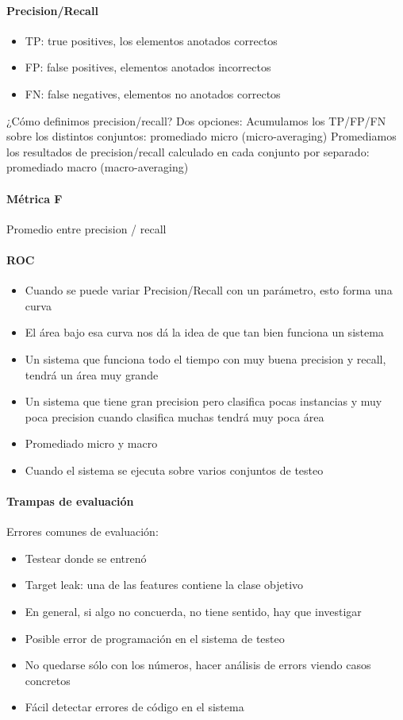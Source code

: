 \documentclass[a4paper,12pt,spanish]{book}
\begin{document}
	\paragraph {Precision/Recall}
	  \begin{itemize}	
	    \item TP: true positives, los elementos anotados correctos
	    \item FP: false positives, elementos anotados incorrectos
	    \item FN: false negatives, elementos no anotados correctos
	  \end{itemize}
	  ¿Cómo definimos precision/recall?
	  Dos opciones:
	  Acumulamos los TP/FP/FN sobre los distintos conjuntos: promediado micro (micro-averaging)
	  Promediamos los resultados de precision/recall calculado en cada conjunto por separado: promediado macro (macro-averaging)

	\paragraph {Métrica F }
	  Promedio entre precision / recall

	\paragraph {ROC}
	  \begin{itemize}
	    \item Cuando se puede variar Precision/Recall con un parámetro, esto forma una curva
	    \item El área bajo esa curva nos dá la idea de que tan bien funciona un sistema
	    \item Un sistema que funciona todo el tiempo con muy buena precision y recall, tendrá un área muy grande
	    \item Un sistema que tiene gran precision pero clasifica pocas instancias y muy poca precision cuando clasifica muchas tendrá muy poca área
	    \item Promediado micro y macro
	    \item Cuando el sistema se ejecuta sobre varios conjuntos de testeo
	  \end{itemize}

	\paragraph {Trampas de evaluación}
	  Errores comunes de evaluación:
	  \begin{itemize}
	    \item Testear donde se entrenó
	    \item Target leak: una de las features contiene la clase objetivo
	    \item En general, si algo no concuerda, no tiene sentido, hay que investigar
	    \item Posible error de programación en el sistema de testeo
	    \item No quedarse sólo con los números, hacer análisis de errors viendo casos concretos
	    \item Fácil detectar errores de código en el sistema
	  \end{itemize}
\end{document}
